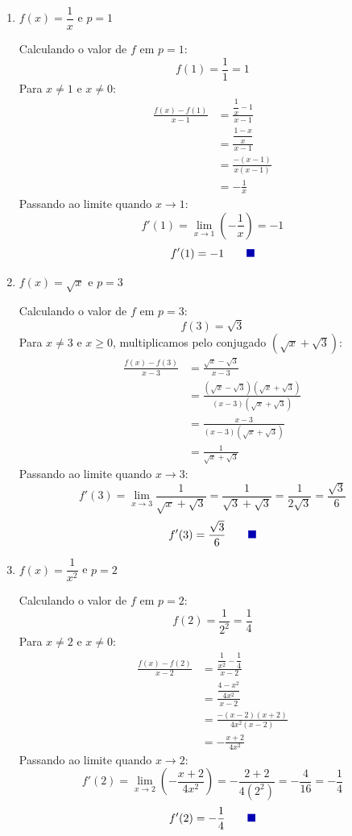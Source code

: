 \documentclass[12pt,a4paper]{article}
\newcommand{\qedsymbolmath}{\tag*{\textcolor{blue!70!black}{\rule{1.6ex}{1.6ex}}}}
\begin{document}
\begin{enumerate}[label=\alph*)]
    \item $f(x) = \dfrac{1}{x}$ e $p = 1$

    Calculando o valor de $f$ em $p = 1$:
    \[
    f(1) = \frac{1}{1} = 1
    \]
    Para $x \neq 1$ e $x \neq 0$:
    \begin{align*}
        \frac{f(x) - f(1)}{x - 1} &= \frac{\dfrac{1}{x} - 1}{x - 1} \\[0.25cm]
        &= \frac{\dfrac{1 - x}{x}}{x - 1} \\[0.25cm]
        &= \frac{-(x - 1)}{x(x - 1)} \\[0.25cm]
        &= -\frac{1}{x}
    \end{align*}
    Passando ao limite quando $x \to 1$:
    \[
    f'(1) = \lim_{x \to 1} \left(-\frac{1}{x}\right) = -1
    \]
    \begin{equation*}
        f'(1) = -1 \qedsymbolmath
    \end{equation*}

    \item $f(x) = \sqrt{x}$ e $p = 3$

    Calculando o valor de $f$ em $p = 3$:
    \[
    f(3) = \sqrt{3}
    \]
    Para $x \neq 3$ e $x \ge 0$, multiplicamos pelo conjugado $(\sqrt{x} + \sqrt{3})$:
    \begin{align*}
        \frac{f(x) - f(3)}{x - 3} &= \frac{\sqrt{x} - \sqrt{3}}{x - 3} \\[0.25cm]
        &= \frac{(\sqrt{x} - \sqrt{3})(\sqrt{x} + \sqrt{3})}{(x - 3)(\sqrt{x} + \sqrt{3})} \\[0.25cm]
        &= \frac{x - 3}{(x - 3)(\sqrt{x} + \sqrt{3})} \\[0.25cm]
        &= \frac{1}{\sqrt{x} + \sqrt{3}}
    \end{align*}
    Passando ao limite quando $x \to 3$:
    \[
    f'(3) = \lim_{x \to 3} \frac{1}{\sqrt{x} + \sqrt{3}} = \frac{1}{\sqrt{3} + \sqrt{3}} = \frac{1}{2\sqrt{3}} = \frac{\sqrt{3}}{6}
    \]
    \begin{equation*}
        f'(3) = \frac{\sqrt{3}}{6} \qedsymbolmath
    \end{equation*}

    \item $f(x) = \dfrac{1}{x^2}$ e $p = 2$

    Calculando o valor de $f$ em $p = 2$:
    \[
    f(2) = \frac{1}{2^2} = \frac{1}{4}
    \]
    Para $x \neq 2$ e $x \neq 0$:
    \begin{align*}
        \frac{f(x) - f(2)}{x - 2} &= \frac{\dfrac{1}{x^2} - \dfrac{1}{4}}{x - 2} \\[0.25cm]
        &= \frac{\dfrac{4 - x^2}{4x^2}}{x - 2} \\[0.25cm]
        &= \frac{-(x - 2)(x + 2)}{4x^2(x - 2)} \\[0.25cm]
        &= -\frac{x + 2}{4x^2}
    \end{align*}
    Passando ao limite quando $x \to 2$:
    \[
    f'(2) = \lim_{x \to 2} \left(-\frac{x + 2}{4x^2}\right) = -\frac{2 + 2}{4(2^2)} = -\frac{4}{16} = -\frac{1}{4}
    \]
    \begin{equation*}
        f'(2) = -\frac{1}{4} \qedsymbolmath
    \end{equation*}


\end{enumerate}
\end{document}
